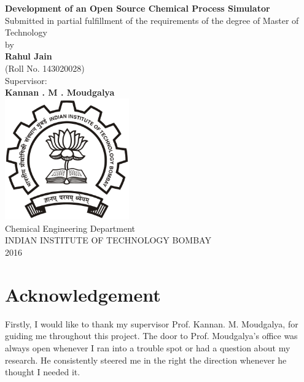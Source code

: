 \documentclass[12pt]{report}
\begin{document}
\begin{titlepage}
\begin{center}
\vspace*{1cm}
\huge
\textbf{Development of an Open Source Chemical Process Simulator} \\
\vspace*{0.7cm}
\Large
Submitted in partial fulfillment of the requirements of the degree of Master of Technology \\
\vspace{0.5cm}
\Large
by \\
\vspace{0.4cm}
\LARGE
\textbf{Rahul Jain} \\
(Roll No. 143020028) \\
\vspace{0.8cm}
\LARGE
Supervisor: \\
\textbf{Kannan . M . Moudgalya} \\
\vspace{1cm}
\includegraphics[width=0.4\textwidth]{university} \\
\vspace{1cm}
\Large
Chemical Engineering Department \\
\vspace{0.5cm}
INDIAN INSTITUTE OF TECHNOLOGY BOMBAY \\
2016
\end{center}
\end{titlepage}

\section*{Acknowledgement}
Firstly, I would like to thank my supervisor Prof. Kannan. M. Moudgalya, for guiding me throughout this project. The door to Prof. Moudgalya's office was always open whenever I ran into a trouble spot or had a question about my research. He consistently steered me in the right the direction whenever he thought I needed it.
\end{document}
